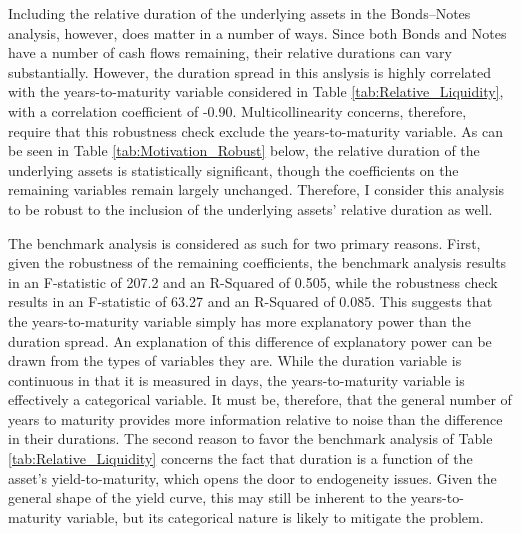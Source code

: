 \documentclass[11pt,a4paper,margin=1.5in]{article}
\begin{document}
Including the relative duration of the underlying assets in the Bonds--Notes analysis, however, does matter in a number of ways.
Since both Bonds and Notes have a number of cash flows remaining, their relative durations can vary substantially.
However, the duration spread in this anslysis is highly correlated with the years-to-maturity variable considered in Table \ref{tab:Relative_Liquidity}, with a correlation coefficient of -0.90. 
Multicollinearity concerns, therefore, require that this robustness check exclude the years-to-maturity variable.
As can be seen in Table \ref{tab:Motivation_Robust} below, the relative duration of the underlying assets is statistically significant, though the coefficients on the remaining variables remain largely unchanged.
Therefore, I consider this analysis to be robust to the inclusion of the underlying assets' relative duration as well.

The benchmark analysis is considered as such for two primary reasons.
First, given the robustness of the remaining coefficients, the benchmark analysis results in an F-statistic of 207.2 and an R-Squared of 0.505, while the robustness check results in an F-statistic of 63.27 and an R-Squared of 0.085.
This suggests that the years-to-maturity variable simply has more explanatory power than the duration spread.
An explanation of this difference of explanatory power can be drawn from the types of variables they are.
While the duration variable is continuous in that it is measured in days, the years-to-maturity variable is effectively a categorical variable.
It must be, therefore, that the general number of years to maturity provides more information relative to noise than the difference in their durations. 
The second reason to favor the benchmark analysis of Table \ref{tab:Relative_Liquidity} concerns the fact that duration is a function of the asset's yield-to-maturity, which opens the door to endogeneity issues.
Given the general shape of the yield curve, this may still be inherent to the years-to-maturity variable, but its categorical nature is likely to mitigate the problem.
\end{document}
